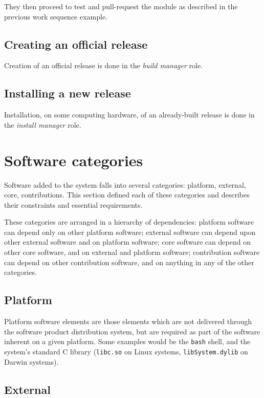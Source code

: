 \documentclass[draftmode,draftwater]{memarticle}
\newcommand{\prog}[1]%
  {\texttt{#1}}
\begin{document}
They then proceed to test and pull-request the module as described in the
previous work sequence example.

\subsection{Creating an official release}

Creation of an official release is done in the \emph{build manager}
role.

\subsection{Installing a new release}

Installation, on some computing hardware, of an already-built release is
done in the \emph{install manager} role.

\section{Software categories}

Software added to the system falls into several categories: platform,
external, core, contributions. This section defined each of these
categories and describes their constraints and essential requirements.

These categories are arranged in a hierarchy of dependencies: platform
software can depend only on other platform software; external software
can depend upon other external software and on platform software; core
software can depend on other core software, and on external and platform
software; contribution software can depend on other contribution
software, and on anything in any of the other categories.

\subsection{Platform}

Platform software elements are those elements which are not delivered
through the software product distribution system, but are required as
part of the software inherent on a given platform. Some examples would
be the \prog{bash} shell, and the system's standard C library
(\prog{libc.so} on Linux systems, \prog{libSystem.dylib} on Darwin
systems).

\subsection{External}
\end{document}
